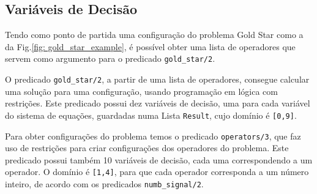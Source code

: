 \subsection{Variáveis de Decisão}

Tendo como ponto de partida uma configuração do problema Gold Star como a da Fig.\ref{fig: gold_star_example}, é possível obter uma lista de operadores que servem como argumento para o predicado \verb|gold_star/2|.

O predicado \verb|gold_star/2|, a partir de uma lista de operadores, consegue calcular uma solução para uma configuração, usando programação em lógica com restrições. Este predicado possui dez variáveis de decisão, uma para cada variável do sistema de equações, guardadas numa Lista \verb|Result|, cujo domínio é \verb|[0,9]|.

Para obter configurações do problema temos o predicado \verb|operators/3|, que faz uso de restrições para criar configurações dos operadores do problema. Este predicado possui também 10 variáveis de decisão, cada uma correspondendo a um operador. O domínio é \verb|[1,4]|, para que cada operador corresponda a um número inteiro, de acordo com os predicados \verb|numb_signal/2|.
